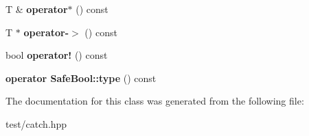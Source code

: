 \begin{DoxyCompactItemize}
\item 
T \& {\bfseries operator$\ast$} () const \hypertarget{classCatch_1_1Ptr_a3a4c139032a8bd1bffa553103d5dbfd3}{}\label{classCatch_1_1Ptr_a3a4c139032a8bd1bffa553103d5dbfd3}

\item 
T $\ast$ {\bfseries operator-\/$>$} () const \hypertarget{classCatch_1_1Ptr_afaa13250d5e0ae5a440726d5e5aa7295}{}\label{classCatch_1_1Ptr_afaa13250d5e0ae5a440726d5e5aa7295}

\item 
bool {\bfseries operator!} () const \hypertarget{classCatch_1_1Ptr_aea1a99ded6d62423ccb9173fab91b56e}{}\label{classCatch_1_1Ptr_aea1a99ded6d62423ccb9173fab91b56e}

\item 
{\bfseries operator Safe\+Bool\+::type} () const \hypertarget{classCatch_1_1Ptr_a27234c04feec43ffe0fd08e045557448}{}\label{classCatch_1_1Ptr_a27234c04feec43ffe0fd08e045557448}

\end{DoxyCompactItemize}


The documentation for this class was generated from the following file\+:\begin{DoxyCompactItemize}
\item 
test/catch.\+hpp\end{DoxyCompactItemize}
